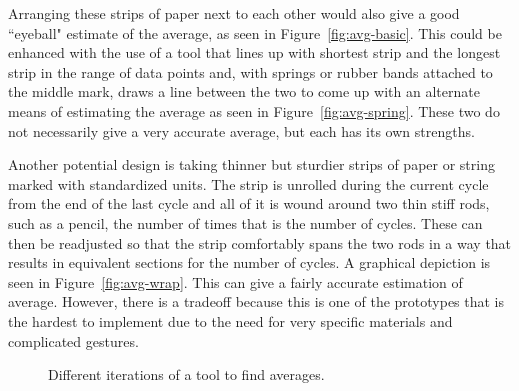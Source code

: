 \documentclass{sig-alternate}
\begin{document}
Arranging these strips of paper next to each other would also give a good ``eyeball" estimate of the average, as seen in Figure~\ref{fig:avg-basic}. This could be enhanced with the use of a tool that lines up with shortest strip and the longest strip in the range of data points and, with springs or rubber bands attached to the middle mark, draws a line between the two to come up with an alternate means of estimating the average as seen in Figure~\ref{fig:avg-spring}. These two do not necessarily give a very accurate average, but each has its own strengths. 

Another potential design is taking thinner but sturdier strips of paper or string marked with standardized units. The strip is unrolled during the current cycle from the end of the last cycle and all of it is wound around two thin stiff rods, such as a pencil, the number of times that is the number of cycles. These can then be readjusted so that the strip comfortably spans the two rods in a way that results in equivalent sections for the number of cycles. A graphical depiction is seen in Figure~\ref{fig:avg-wrap}. This can give a fairly accurate estimation of average. However, there is a tradeoff because this is one of the prototypes that is the hardest to implement due to the need for very specific materials and complicated gestures.

\begin{figure}%
    \centering
    \qquad
    \qquad
    \caption{Different iterations of a tool to find averages.}%
    \label{fig:avg}
\end{figure}
\end{document}
